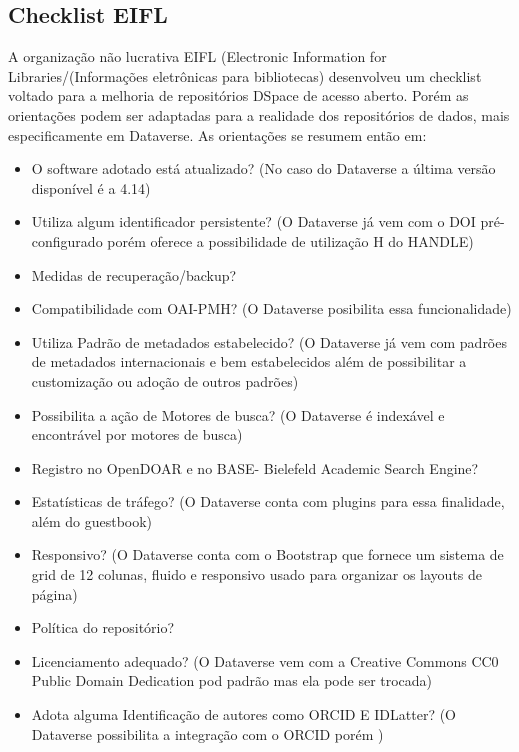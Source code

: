 \documentclass[12pt,hidelinks]{article}
\begin{document}
\subsection{Checklist EIFL}

\qquad A organização não lucrativa EIFL (Electronic Information for Libraries/(Informações eletrônicas para bibliotecas) desenvolveu um checklist voltado para a melhoria de repositórios DSpace de acesso aberto. Porém as orientações podem ser adaptadas para a realidade dos repositórios de dados, mais especificamente em Dataverse. As orientações se resumem então em:

\begin{itemize}

    \item O software adotado está atualizado? (No caso do Dataverse a última versão disponível é a 4.14)
    \item Utiliza algum identificador persistente? (O Dataverse  já vem com o DOI pré-configurado porém oferece a possibilidade de utilização H do HANDLE)
    \item Medidas de recuperação/backup?
    \item Compatibilidade com OAI-PMH? (O Dataverse posibilita essa funcionalidade)
    \item Utiliza Padrão de metadados estabelecido? (O Dataverse já vem com padrões de metadados internacionais e bem estabelecidos além de possibilitar a customização ou adoção de outros padrões)
    \item Possibilita a ação de Motores de busca? (O Dataverse é indexável e encontrável por motores de busca)
    \item  Registro no OpenDOAR e no BASE- Bielefeld Academic Search Engine?
    \item Estatísticas de tráfego? (O Dataverse conta com plugins para essa finalidade, além do guestbook)
    \item Responsivo? (O Dataverse conta com o Bootstrap que fornece um sistema de grid de 12 colunas, fluido e responsivo usado para organizar os layouts de página)
    \item Política do repositório?
    \item Licenciamento adequado? (O Dataverse vem com a Creative Commons CC0 Public Domain Dedication pod padrão mas ela pode ser trocada)
    \item Adota alguma Identificação de autores como ORCID E IDLatter? (O Dataverse possibilita a integração com o ORCID porém )

\end{itemize}
\end{document}
